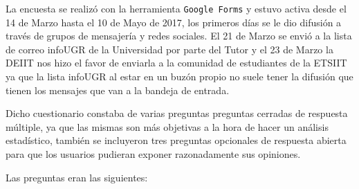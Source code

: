 \bigskip
La encuesta se realizó con la herramienta \texttt{Google Forms} y estuvo activa desde el 14 de Marzo hasta el 10 de Mayo de 2017, los primeros días se le dio difusión a través de grupos de mensajería y redes sociales. El 21 de Marzo se envió a la lista de correo infoUGR de la Universidad por parte del Tutor y el 23 de Marzo la DEIIT nos hizo el favor de enviarla a la comunidad de estudiantes de la ETSIIT ya que la lista infoUGR al estar en un buzón propio no suele tener la difusión que tienen los mensajes que van a la bandeja de entrada.

\bigskip
Dicho cuestionario constaba de varias preguntas preguntas cerradas de respuesta múltiple, ya que las mismas son más objetivas a la hora de hacer un análisis estadístico, también se incluyeron tres preguntas opcionales de respuesta abierta para que los usuarios pudieran exponer razonadamente sus opiniones.

Las preguntas eran las siguientes:

